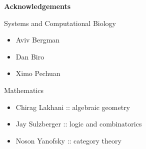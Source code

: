 \begin{frame}
\textbf{Acknowledgements}
\begin{block}{Systems and Computational Biology}
\begin{small}
\begin{itemize}
\item Aviv Bergman
\item Dan Biro
\item Ximo Pechuan
\end{itemize}
\end{small}
\end{block}
\begin{block}{Mathematics}
\begin{small}
\begin{itemize}
\item Chirag Lakhani :: algebraic geometry
\item Jay Sulzberger :: logic and combinatorics
\item Noson Yanofsky :: category theory
\end{itemize}
\end{small}
\end{block}
\end{frame}
